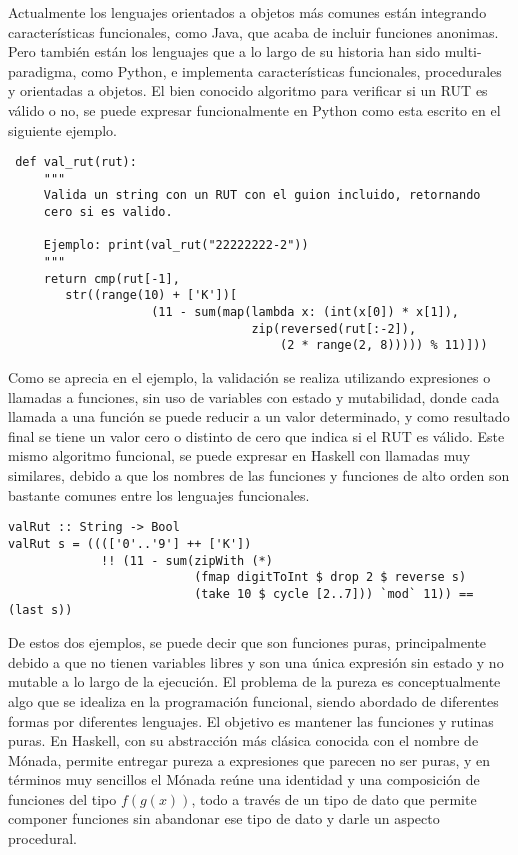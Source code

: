 \documentclass[11pt]{article}
\begin{document}
Actualmente los lenguajes orientados a objetos más comunes están
integrando características funcionales, como Java, que acaba de
incluir funciones anonimas.  Pero también están los lenguajes que a lo
largo de su historia han sido multi-paradigma, como Python, e
implementa características funcionales, procedurales y orientadas a
objetos. El bien conocido algoritmo para verificar si un RUT es válido
o no, se puede expresar funcionalmente en Python como esta escrito en
el siguiente ejemplo.


\begin{verbatim}
 def val_rut(rut):
     """
     Valida un string con un RUT con el guion incluido, retornando
     cero si es valido.

     Ejemplo: print(val_rut("22222222-2"))
     """
     return cmp(rut[-1],
		str((range(10) + ['K'])[
                    (11 - sum(map(lambda x: (int(x[0]) * x[1]),
                                  zip(reversed(rut[:-2]),
                                      (2 * range(2, 8))))) % 11)]))

\end{verbatim}


Como se aprecia en el ejemplo, la validación se realiza utilizando
 expresiones o llamadas a funciones, sin uso de variables con estado y
 mutabilidad, donde cada llamada a una función se puede reducir a un
 valor determinado, y como resultado final se tiene un valor cero o
 distinto de cero que indica si el RUT es válido.  Este mismo
 algoritmo funcional, se puede expresar en Haskell con llamadas muy
 similares, debido a que los nombres de las funciones y funciones de
 alto orden son bastante comunes entre los lenguajes funcionales.


\begin{verbatim}
valRut :: String -> Bool
valRut s = (((['0'..'9'] ++ ['K'])
             !! (11 - sum(zipWith (*)
                          (fmap digitToInt $ drop 2 $ reverse s)
                          (take 10 $ cycle [2..7])) `mod` 11)) == (last s))
\end{verbatim}


De estos dos ejemplos, se puede decir que son funciones puras,
principalmente debido a que no tienen variables libres y son una única
expresión sin estado y no mutable a lo largo de la ejecución. El
problema de la pureza es conceptualmente algo que se idealiza en la
programación funcional, siendo abordado de diferentes formas por
diferentes lenguajes. El objetivo es mantener las funciones y rutinas
puras. En Haskell, con su abstracción más clásica conocida con el
nombre de Mónada, permite entregar pureza a expresiones que parecen no
ser puras, y en términos muy sencillos el Mónada reúne una identidad y
una composición de funciones del tipo \(f(g(x))\), todo a través de un
tipo de dato que permite componer funciones sin abandonar ese tipo de
dato y darle un aspecto procedural.
\end{document}
